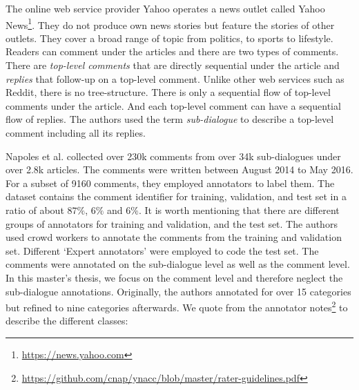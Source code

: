 The online web service provider Yahoo operates a news outlet called Yahoo News\footnote{\url{https://news.yahoo.com}}. They do not produce own news stories but feature the stories of other outlets. They cover a broad range of topic from politics, to sports to lifestyle. Readers can comment under the articles and there are two types of comments.
There are \textit{top-level comments} that are directly sequential under the article and \textit{replies} that follow-up on a top-level comment.
Unlike other web services such as Reddit, there is no tree-structure. There is only a sequential flow of top-level comments under the article. And each top-level comment can have a sequential flow of replies. The authors used the term \textit{sub-dialogue} to describe a top-level comment including all its replies.

Napoles et al. collected over 230k comments from over 34k sub-dialogues under over 2.8k articles. The comments were written between August 2014 to May 2016. For a subset of 9160 comments, they employed annotators to label them. The dataset contains the comment identifier for training, validation, and test set in a ratio of about $87\%$, $6\%$ and $6\%$. It is worth mentioning that there are different groups of annotators for training and validation, and the test set. The authors used crowd workers to annotate the comments from the training and validation set. Different `Expert annotators' were employed to code the test set.
The comments were annotated on the sub-dialogue level as well as the comment level.
In this master's thesis, we focus on the comment level and therefore neglect the sub-dialogue annotations.
Originally, the authors annotated for over 15 categories but refined to nine categories afterwards. We quote from the annotator notes\footnote{\url{https://github.com/cnap/ynacc/blob/master/rater-guidelines.pdf}} to describe the different classes:
